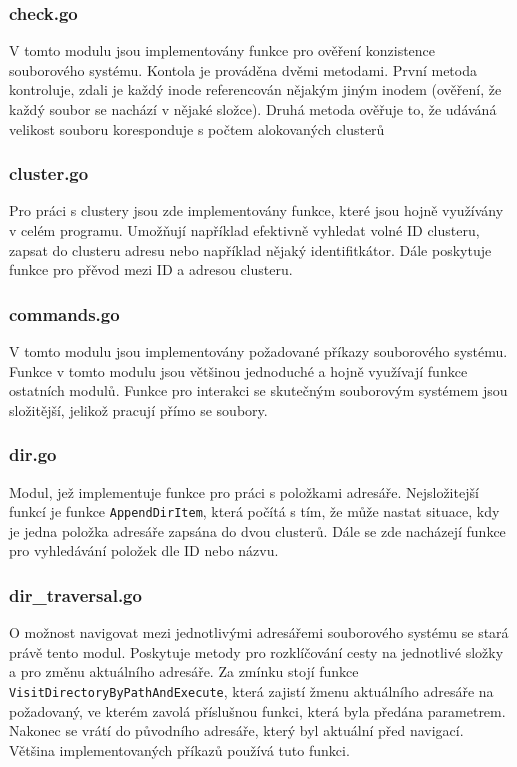 \documentclass[12pt, a4paper]{article}
\begin{document}
			\subsubsection{check.go}
			V tomto modulu jsou implementovány funkce pro ověření konzistence souborového systému. Kontola je prováděna dvěmi metodami. První metoda kontroluje, zdali je každý inode referencován nějakým jiným inodem (ověření, že každý soubor se nachází v nějaké složce). Druhá metoda ověřuje to, že udáváná velikost souboru koresponduje s počtem alokovaných clusterů

			\subsubsection{cluster.go}
			Pro práci s clustery jsou zde implementovány funkce, které jsou hojně využívány v celém programu. Umožňují například efektivně vyhledat volné ID clusteru, zapsat do clusteru adresu nebo například nějaký identifitkátor. Dále poskytuje funkce pro přěvod mezi ID a adresou clusteru.
			
			\subsubsection{commands.go}
			V tomto modulu jsou implementovány požadované příkazy souborového systému. Funkce v tomto modulu jsou většinou jednoduché a hojně využívají funkce ostatních modulů. Funkce pro interakci se skutečným souborovým systémem jsou složitější, jelikož pracují přímo se soubory.
						
			\subsubsection{dir.go}
			Modul, jež implementuje funkce pro práci s položkami adresáře. Nejsložitejší funkcí je funkce \texttt{AppendDirItem}, která počítá s tím, že může nastat situace, kdy je jedna položka adresáře zapsána do dvou clusterů. Dále se zde nacházejí funkce pro vyhledávání položek dle ID nebo názvu.
									
			\subsubsection{dir\_traversal.go}
O možnost navigovat mezi jednotlivými adresářemi souborového systému se stará právě tento modul. Poskytuje metody pro rozklíčování cesty na jednotlivé složky a pro změnu aktuálního adresáře. Za zmínku stojí funkce \texttt{VisitDirectoryByPathAndExecute}, která zajistí žmenu aktuálního adresáře na požadovaný, ve kterém zavolá příslušnou funkci, která byla předána parametrem. Nakonec se vrátí do původního adresáře, který byl aktuální před navigací. Většina implementovaných příkazů používá tuto funkci.
\end{document}
